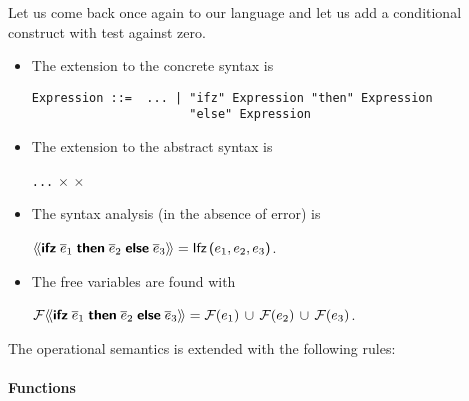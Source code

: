 Let us come back once again to our language and let us add a
conditional construct with test against zero.
\begin{itemize}

  \item The extension to the concrete syntax is
\begin{verbatim}
Expression ::=  ... | "ifz" Expression "then" Expression 
                      "else" Expression
\end{verbatim}

  \item The extension to the abstract syntax is

\noindent \Xtype {} \equal \texttt{...} \vbar {} \Xof
{} \(\times\)  \(\times\) 

  \item The syntax analysis (in the absence of error) is

\noindent $\src{\kwd{ifz} \; \meta{e}_1 \; \Xthen \; \meta{e}_2 \;
  \Xelse \; \meta{e}_3} = \cst{Ifz} \, \lpar e_1, e_2, e_3\rpar$.

  \item The free variables are found with

\noindent $\mathcal{F} \src{\kwd{ifz} \; \meta{e}_1 \; \Xthen \;
  \meta{e}_2 \; \Xelse \; \meta{e}_3} = \mathcal{F} (e_1) \, \cup \,
          \mathcal{F} (e_2) \, \cup \, \mathcal{F} (e_3)$.

\end{itemize}
The operational semantics is extended with the following rules:

\paragraph{Functions}

